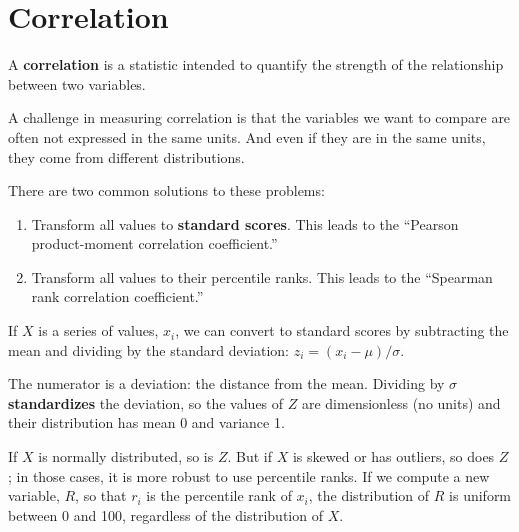 \documentclass[12pt]{book}
\begin{document}
\section{Correlation}

A {\bf correlation} is a statistic intended to quantify the strength
of the relationship between two variables.

A challenge in measuring correlation is that the variables we want to
compare are often not expressed in the same units.  And even if they
are in the same units, they come from different distributions.

There are two common solutions to these problems:

\begin{enumerate}

\item Transform all values to {\bf standard scores}.  This leads to
the ``Pearson product-moment correlation coefficient.''

\item Transform all values to their percentile ranks.  This
leads to the ``Spearman rank correlation coefficient.''

\end{enumerate}

If $X$ is a series of values, $x_i$, we can convert to standard
scores by subtracting the mean and dividing by the standard deviation:
$z_i = (x_i - \mu) / \sigma$.

The numerator is a deviation: the distance from the mean.  Dividing by
$\sigma$ {\bf standardizes} the deviation, so the values of $Z$ are
dimensionless (no units) and their distribution has mean 0 and
variance 1.

If $X$ is normally distributed, so is $Z$.  But if $X$ is skewed or has
outliers, so does $Z$; in those cases, it is more robust to use
percentile ranks.  If we compute a new variable, $R$, so that $r_i$ is
the percentile rank of $x_i$, the distribution of $R$ is uniform
between 0 and 100, regardless of the distribution of $X$.
 
\end{document}
